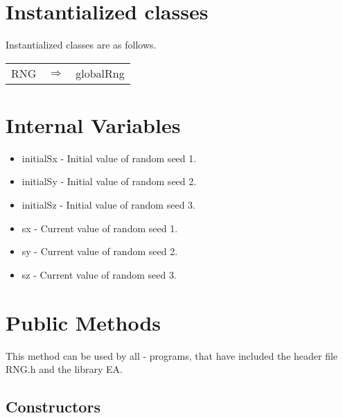 \vspace*{10mm}

\section{Instantialized classes}

\noindent
Instantialized classes are as follows.

\vspace*{3mm}

\begin{tabular}{lll}
RNG       & $\Longrightarrow$ & globalRng   \\
\end{tabular}

\vspace*{3mm}

\section{Internal Variables}

\begin{itemize}
\item initialSx - Initial value of random seed 1.
\item initialSy - Initial value of random seed 2.
\item initialSz - Initial value of random seed 3.
\item sx - Current value of random seed 1.
\item sy - Current value of random seed 2.
\item sz - Current value of random seed 3.
\end{itemize}


\vspace*{10mm}

\section{Public Methods}

\noindent
This method can be used by all \cpp - programs, that have included the
header file RNG.h and the library EA.

\subsection{Constructors}

